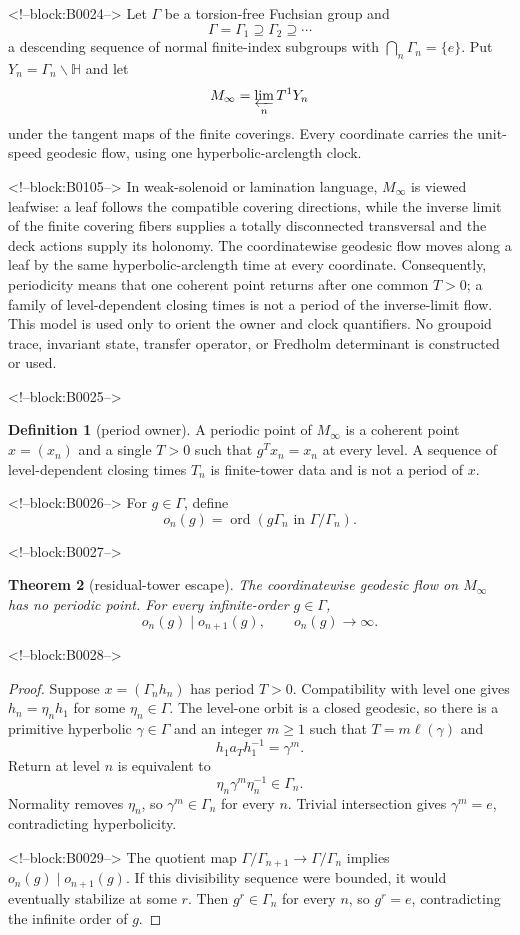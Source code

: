 \documentclass[11pt]{article}
\newtheorem{theorem}{Theorem}[section]
\theoremstyle{definition}
\newtheorem{definition}[theorem]{Definition}
\theoremstyle{remark}
\newcommand{\HH}{\mathbb H}
\newcommand{\ord}{\operatorname{ord}}
\begin{document}
<!--block:B0024-->
Let $\Gamma$ be a torsion-free Fuchsian group and
\[
\Gamma=\Gamma_1\supseteq\Gamma_2\supseteq\cdots
\]
a descending sequence of normal finite-index subgroups with
$\bigcap_n\Gamma_n=\{e\}$. Put $Y_n=\Gamma_n\backslash\HH$ and let
\[
M_\infty=\varprojlim_n T^1Y_n
\]
under the tangent maps of the finite coverings. Every coordinate carries the unit-speed geodesic flow, using one hyperbolic-arclength clock.

<!--block:B0105-->
In weak-solenoid or lamination language, $M_\infty$ is viewed leafwise: a leaf follows the compatible covering directions, while the inverse limit of the finite covering fibers supplies a totally disconnected transversal and the deck actions supply its holonomy. The coordinatewise geodesic flow moves along a leaf by the same hyperbolic-arclength time at every coordinate. Consequently, periodicity means that one coherent point returns after one common $T>0$; a family of level-dependent closing times is not a period of the inverse-limit flow. This model is used only to orient the owner and clock quantifiers. No groupoid trace, invariant state, transfer operator, or Fredholm determinant is constructed or used.

<!--block:B0025-->
\begin{definition}[period owner]
A periodic point of $M_\infty$ is a coherent point $x=(x_n)$ and a single $T>0$ such that $g^T x_n=x_n$ at every level. A sequence of level-dependent closing times $T_n$ is finite-tower data and is not a period of $x$.
\end{definition}

<!--block:B0026-->
For $g\in\Gamma$, define
\[
o_n(g)=\ord(g\Gamma_n\text{ in }\Gamma/\Gamma_n).
\]

<!--block:B0027-->
\begin{theorem}[residual-tower escape]\label{thm:residual}
The coordinatewise geodesic flow on $M_\infty$ has no periodic point. For every infinite-order $g\in\Gamma$,
\[
o_n(g)\mid o_{n+1}(g),
\qquad
o_n(g)\longrightarrow\infty.
\]
\end{theorem}

<!--block:B0028-->
\begin{proof}
Suppose $x=(\Gamma_nh_n)$ has period $T>0$. Compatibility with level one gives $h_n=\eta_nh_1$ for some $\eta_n\in\Gamma$. The level-one orbit is a closed geodesic, so there is a primitive hyperbolic $\gamma\in\Gamma$ and an integer $m\geq1$ such that $T=m\ell(\gamma)$ and
\[
h_1a_Th_1^{-1}=\gamma^m.
\]
Return at level $n$ is equivalent to
\[
\eta_n\gamma^m\eta_n^{-1}\in\Gamma_n.
\]
Normality removes $\eta_n$, so $\gamma^m\in\Gamma_n$ for every $n$. Trivial intersection gives $\gamma^m=e$, contradicting hyperbolicity.

<!--block:B0029-->
The quotient map $\Gamma/\Gamma_{n+1}\to\Gamma/\Gamma_n$ implies $o_n(g)\mid o_{n+1}(g)$. If this divisibility sequence were bounded, it would eventually stabilize at some $r$. Then $g^r\in\Gamma_n$ for every $n$, so $g^r=e$, contradicting the infinite order of $g$.
\end{proof}
\end{document}
